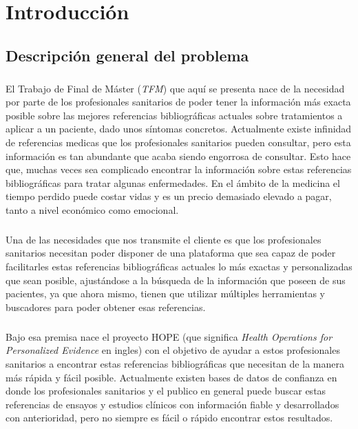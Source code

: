\chapter{Introducción}
\label{chapter:introduccion}


\section{Descripción general del problema}
\label{def:def1}

\paragraph{}
El Trabajo de Final de Máster (\textit{TFM}) que aquí se presenta nace de la necesidad por parte de los profesionales sanitarios de poder tener la información más exacta posible sobre las mejores referencias bibliográficas actuales sobre tratamientos a aplicar a un paciente, dado unos síntomas concretos. Actualmente existe infinidad de referencias medicas que los profesionales sanitarios pueden consultar, pero esta información es tan abundante que acaba siendo engorrosa de consultar\cite{ref:search_internet}. Esto hace que, muchas veces sea complicado encontrar la información sobre estas referencias bibliográficas para tratar algunas enfermedades. En el ámbito de la medicina el tiempo perdido puede costar vidas y es un precio demasiado elevado a pagar, tanto a nivel económico como emocional.

\paragraph{}
Una de las necesidades que nos transmite el cliente es que los profesionales sanitarios necesitan poder disponer de una plataforma que sea capaz de poder facilitarles estas referencias bibliográficas actuales lo más exactas y personalizadas que sean posible, ajustándose a la búsqueda de la información que poseen de sus pacientes, ya que ahora mismo, tienen que utilizar múltiples herramientas y buscadores para poder obtener esas referencias\cite{ref:busqueda_relevante}.

\paragraph{}
Bajo esa premisa nace el proyecto HOPE\cite{ref:hope_home} (que significa \textit{Health Operations for Personalized Evidence} en ingles) con el objetivo de ayudar a estos profesionales sanitarios a encontrar estas referencias bibliográficas que necesitan de la manera más rápida y fácil posible. Actualmente existen bases de datos de confianza en donde los profesionales sanitarios y el publico en general puede buscar estas referencias de ensayos y estudios clínicos con información fiable y desarrollados con anterioridad, pero no siempre es fácil o rápido encontrar estos resultados\cite{ref:search_results_study}.

